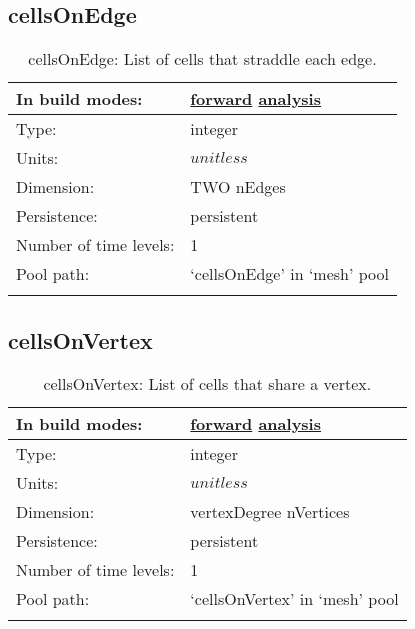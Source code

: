 \subsection[cellsOnEdge]{cellsOnEdge}
\label{subsec:var_sec_mesh_cellsOnEdge}
\begin{center}
\begin{longtable}{| p{2.0in} | p{4.0in} |}
        \hline 
        In build modes: & \hyperref[subsec:forward_var_tab_mesh]{forward} \hyperref[subsec:analysis_var_tab_mesh]{analysis} \\
        \hline 
        Type: & integer \\
        \hline 
        Units: & $unitless$ \\
        \hline 
        Dimension: & TWO nEdges \\
        \hline 
        Persistence: & persistent \\
        \hline 
        Number of time levels: & 1 \\
        \hline 
            Pool path: & `cellsOnEdge' in `mesh' pool \\
		 \hline 
    \caption{cellsOnEdge: List of cells that straddle each edge.}
\end{longtable}
\end{center}
\subsection[cellsOnVertex]{cellsOnVertex}
\label{subsec:var_sec_mesh_cellsOnVertex}
\begin{center}
\begin{longtable}{| p{2.0in} | p{4.0in} |}
        \hline 
        In build modes: & \hyperref[subsec:forward_var_tab_mesh]{forward} \hyperref[subsec:analysis_var_tab_mesh]{analysis} \\
        \hline 
        Type: & integer \\
        \hline 
        Units: & $unitless$ \\
        \hline 
        Dimension: & vertexDegree nVertices \\
        \hline 
        Persistence: & persistent \\
        \hline 
        Number of time levels: & 1 \\
        \hline 
            Pool path: & `cellsOnVertex' in `mesh' pool \\
		 \hline 
    \caption{cellsOnVertex: List of cells that share a vertex.}
\end{longtable}
\end{center}
